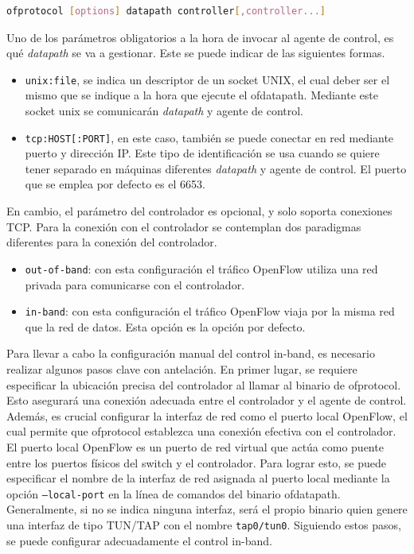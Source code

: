 \begin{lstlisting}[language= bash, style=Consola, caption={Interfaz CLI del binario ofprotocol},label=code:binofproto]
    ofprotocol [options] datapath controller[,controller...]
\end{lstlisting}
\vspace{0.5cm}

Uno de los parámetros obligatorios a la hora de invocar al agente de control, es qué \textit{datapath} se va a gestionar. Este se puede indicar de las siguientes formas.

\begin{itemize}
    \item \texttt{unix:file}, se indica un descriptor de un socket UNIX, el cual deber ser el mismo que se indique a la hora que ejecute el ofdatapath. Mediante este socket unix se comunicarán \textit{datapath} y agente de control.

    \item \texttt{tcp:HOST[:PORT]}, en este caso, también se puede conectar en red mediante puerto y dirección IP. Este tipo de identificación se usa cuando se quiere tener separado en máquinas diferentes \textit{datapath} y agente de control. El puerto que se emplea por defecto es el 6653.
\end{itemize}

En cambio, el parámetro del controlador es opcional, y solo soporta conexiones TCP. Para la conexión con el controlador se contemplan dos paradigmas diferentes para la conexión del controlador.

\begin{itemize}
    \item \texttt{out-of-band}: con esta configuración el tráfico OpenFlow utiliza una red privada para comunicarse con el controlador.

    \item \texttt{in-band}: con esta configuración el tráfico OpenFlow viaja por la misma red que la red de datos. Esta opción es la opción por defecto.
\end{itemize}

Para llevar a cabo la configuración manual del control in-band, es necesario realizar algunos pasos clave con antelación. En primer lugar, se requiere especificar la ubicación precisa del controlador al llamar al binario de ofprotocol. Esto asegurará una conexión adecuada entre el controlador y el agente de control. Además, es crucial configurar la interfaz de red como el puerto local OpenFlow, el cual permite que ofprotocol establezca una conexión efectiva con el controlador. El puerto local OpenFlow es un puerto de red virtual que actúa como puente entre los puertos físicos del switch y el controlador. Para lograr esto, se puede especificar el nombre de la interfaz de red asignada al puerto local mediante la opción \texttt{--local-port} en la línea de comandos del binario ofdatapath. Generalmente, si no se indica ninguna interfaz, será el propio binario quien genere una interfaz de tipo TUN/TAP con el nombre \texttt{tap0/tun0}. Siguiendo estos pasos, se puede configurar adecuadamente el control in-band.


